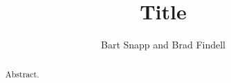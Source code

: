 \documentclass[nooutcomes]{ximera}
\title{Title}
\author{Bart Snapp and Brad Findell}
\begin{document}
\begin{abstract}
Abstract. 
\end{abstract}
\maketitle
\end{document}
